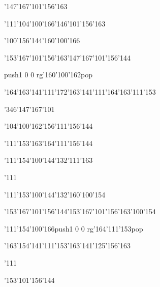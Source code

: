 \null\vfill\ipa\centerline{\enskip\enskip\enskip\enskip\enskip\enskip\enskip\enskip\char'147\char'167\char'101\char'156\char'163}\medskip\centerline{\enskip\char'111\enskip\char'104\char'100\char'166\enskip\char'146\char'101\char'156\char'163\enskip\enskip\enskip}\medskip\centerline{\enskip\enskip\enskip\enskip\enskip\enskip\enskip\enskip\enskip\enskip\enskip\enskip}\medskip\centerline{\enskip\enskip\enskip\enskip\char'100\char'156\char'144\enskip\enskip\enskip\enskip\char'160\char'100\char'166}\medskip\centerline{\enskip\enskip\enskip\enskip\enskip\char'153\char'167\char'101\char'156\char'163\enskip\char'147\char'167\char'101\char'156\char'144\enskip\enskip\enskip}\medskip\centerline{\enskip\enskip\enskip\pdfcolorstack\match push{1 0 0 rg}\char'160\char'100\char'162\pdfcolorstack\match pop{}\enskip\enskip\enskip\enskip\enskip\enskip\enskip\enskip\enskip\enskip\enskip}\medskip\centerline{\enskip\char'164\char'163\char'141\char'111\char'172\enskip\enskip\enskip\enskip\char'163\char'141\char'111\char'164\char'163\enskip\char'111\char'153}\medskip\centerline{\enskip\char'346\enskip\char'147\char'167\char'101\enskip\enskip\enskip\enskip\enskip\enskip}\medskip\centerline{\enskip\enskip\enskip\enskip\enskip\enskip\enskip\char'104\char'100\char'162\enskip\char'156\char'111\char'156\char'144}\medskip\vfill\footline{\hfil\tt\folio\hfil}\eject
\null\vfill\ipa\centerline{\enskip\char'111\char'153\enskip\enskip\enskip\enskip\enskip\char'163\char'164\char'111\char'156\char'144}\medskip\centerline{\enskip\char'111\enskip\enskip\enskip\enskip\enskip\char'154\char'100\char'144\char'132\enskip\char'111\char'163}\medskip\centerline{\enskip\char'111\enskip\enskip\enskip\enskip\enskip\enskip\enskip\enskip\enskip\enskip}\medskip\centerline{\enskip\char'111\char'153\enskip\char'100\char'144\char'132\enskip\enskip\enskip\enskip\char'160\char'100\char'154}\medskip\centerline{\enskip\enskip\enskip\enskip\enskip\char'153\char'167\char'101\char'156\char'144\enskip\char'153\char'167\char'101\char'156\char'163\enskip\char'100\char'154}\medskip\centerline{\enskip\char'111\enskip\char'154\char'100\char'166\enskip\pdfcolorstack\match push{1 0 0 rg}\char'164\char'111\char'153\pdfcolorstack\match pop{}\enskip\enskip\enskip\enskip\enskip\enskip\enskip}\medskip\centerline{\enskip\char'163\char'154\char'141\char'111\char'153\enskip\enskip\enskip\enskip\char'163\char'141\char'125\char'156\char'163\enskip\enskip\enskip}\medskip\centerline{\enskip\char'111\enskip\enskip\enskip\enskip\enskip\enskip\enskip\enskip\enskip\enskip}\medskip\centerline{\enskip\enskip\enskip\enskip\enskip\enskip\enskip\enskip\enskip\enskip\enskip\char'153\char'101\char'156\char'144}\medskip\vfill\footline{\hfil\tt\folio\hfil}\eject
